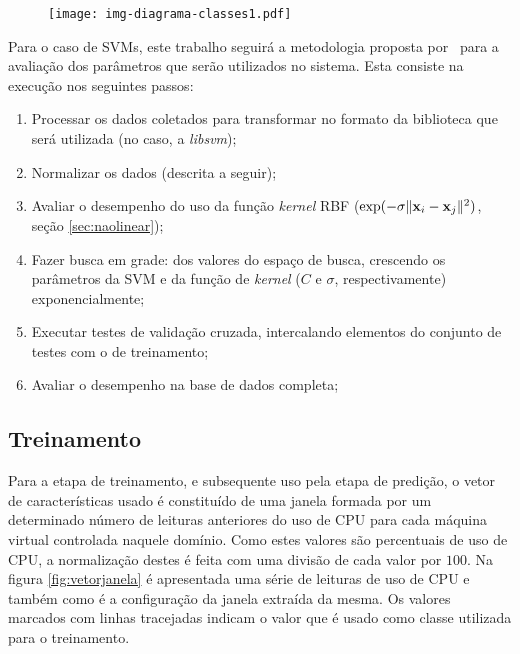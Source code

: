 \begin{figure}[htp]
\centering
\texttt{[image: img-diagrama-classes1.pdf]}
\label{fig:diagramaclasses1}
\end{figure}


Para o caso de SVMs, este trabalho seguirá a metodologia proposta
por~ para a avaliação dos parâmetros que serão
utilizados no sistema. Esta consiste na execução nos seguintes passos:
\begin{enumerate}
  \item Processar os dados coletados para transformar no formato da biblioteca
        que será utilizada (no caso, a \emph{libsvm});
  \item Normalizar os dados (descrita a seguir);
  \item Avaliar o desempenho do uso da função \emph{kernel} RBF 
        ($\exp(-\sigma\lVert \mathbf{x}_i-\mathbf{x}_j \rVert^2)$, seção
         \ref{sec:naolinear});
  \item Fazer busca em grade: dos valores do espaço de busca, crescendo os
	 parâmetros da SVM e da função de \emph{kernel} ($C$ e $\sigma$,
         respectivamente) exponencialmente;
  \item Executar testes de validação cruzada, intercalando elementos do conjunto
        de testes com o de treinamento;
  \item Avaliar o desempenho na base de dados completa;
\end{enumerate}

\subsection{Treinamento}

Para a etapa de treinamento, e subsequente uso pela etapa de predição, o
vetor de características usado é constituído de uma janela
formada por um determinado número de leituras anteriores do uso de CPU para
cada máquina virtual controlada naquele domínio. Como estes valores são
percentuais de uso de CPU, a normalização destes é feita com uma divisão
de cada valor por $100$. Na figura \ref{fig:vetorjanela} é apresentada uma
série de leituras de uso de CPU e também como é a configuração da janela
extraída da mesma. Os valores marcados com linhas tracejadas indicam o valor
que é usado como classe utilizada para o treinamento.

